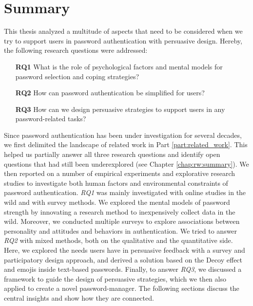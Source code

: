 \chapter[Summary]{Summary}\label{chap:summary}
This thesis analyzed a multitude of aspects that need to be considered when we try to support users in password authentication with persuasive design. Hereby, the following research questions were addressed:

\begin{itemize}
	\item[\textbf{RQ1}] What is the role of psychological factors and mental models for password selection and coping strategies?
	\item[\textbf{RQ2}] How can password authentication be simplified for users? 
	\item[\textbf{RQ3}] How can we design persuasive strategies to support users in any password-related tasks?
\end{itemize}

Since password authentication has been under investigation for several decades, we first delimited the landscape of related work in Part \ref{part:related_work}. This helped us partially answer all three research questions and identify open questions that had still been underexplored (see Chapter \ref{chap:rw:summary}). We then reported on a number of empirical experiments and explorative research studies to investigate both human factors and environmental constraints of password authentication. \textit{RQ1} was mainly investigated with online studies in the wild and with survey methods. We explored the mental models of password strength by innovating a research method to inexpensively collect data in the wild. Moreover, we conducted multiple surveys to explore associations between personality and attitudes and behaviors in authentication. We tried to answer \textit{RQ2} with mixed methods, both on the qualitative and the quantitative side. Here, we explored the needs users have in persuasive feedback with a survey and participatory design approach, and derived a solution based on the Decoy effect and emojis inside text-based passwords. Finally, to answer \textit{RQ3}, we discussed a framework to guide the design of persuasive strategies, which we then also applied to create a novel password-manager. The following sections discuss the central insights and show how they are connected.

